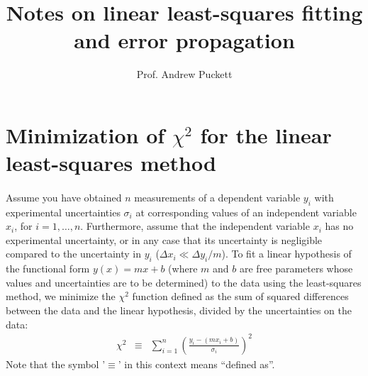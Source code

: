 \documentclass{article}
\begin{document}
\title{Notes on linear least-squares fitting and error propagation}
\author{Prof. Andrew Puckett}
\maketitle
\section{Minimization of $\chi^2$ for the linear least-squares method}
\paragraph{}
Assume you have obtained $n$ measurements of a dependent variable $y_i$ with experimental uncertainties $\sigma_i$ at corresponding values of an independent variable $x_i$, for $i=1,\ldots , n$. Furthermore, assume that the independent variable $x_i$ has no experimental uncertainty, or in any case that its uncertainty is negligible compared to the uncertainty in $y_i$ ($\Delta x_i \ll \Delta y_i/m$). To fit a linear hypothesis of the functional form $y(x) = mx + b$ (where $m$ and $b$ are free parameters whose values and uncertainties are to be determined) to the data using the least-squares method, we minimize the $\chi^2$ function defined as the sum of squared differences between the data and the linear hypothesis, divided by the uncertainties on the data: 
\begin{eqnarray}
  \chi^2 &\equiv& \sum_{i=1}^{n} \left(\frac{y_i - (mx_i+b)}{\sigma_i}\right)^2 
\end{eqnarray}
Note that the symbol '$\equiv$' in this context means ``defined as''.
\end{document}
